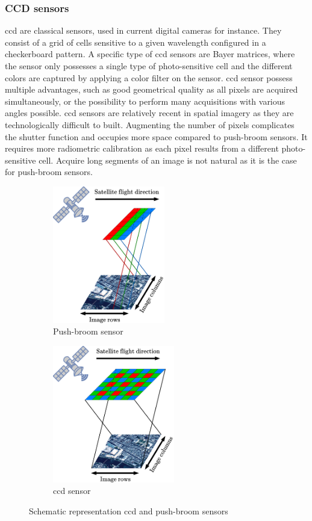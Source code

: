 \subsubsection{CCD sensors}
\acrfull{ccd} are classical sensors, used in current digital cameras for instance. They consist of a grid of cells sensitive to a given wavelength configured in a checkerboard pattern. A specific type of \acrshort{ccd} sensors are Bayer matrices, where the sensor only possesses a single type of photo-sensitive cell and the different colors are captured by applying a color filter on the sensor. \acrshort{ccd} sensor possess multiple advantages, such as good geometrical quality as all pixels are acquired simultaneously, or the possibility to perform many acquisitions with various angles possible. \acrshort{ccd} sensors are relatively recent in spatial imagery as they are technologically difficult to built. Augmenting the number of pixels complicates the shutter function and occupies more space compared to push-broom sensors. It requires more radiometric calibration as each pixel results from a different photo-sensitive cell. Acquire long segments of an image is not natural as it is the case for push-broom sensors.

\begin{figure}
    \begin{subfigure}[t]{0.5\linewidth}
        \centering
        \includegraphics[height=6cm]{Images/Chap_1/pushbrrom.png}
        \caption{Push-broom sensor}
        \label{fig:pushbroom}
    \end{subfigure}
    \begin{subfigure}[t]{0.5\linewidth}
        \centering
        \includegraphics[height=6cm]{Images/Chap_1/CCD.png}
        \caption{\acrshort{ccd} sensor}
        \label{fig:ccd}
    \end{subfigure}
    \caption{Schematic representation \acrshort{ccd} and push-broom sensors}
    \label{fig:ccd_pushbroom_sensors}
\end{figure}

